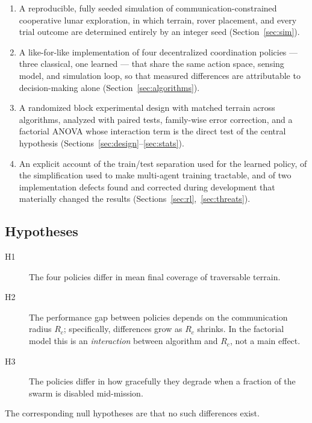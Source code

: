 \documentclass[11pt]{article}
\begin{document}
\begin{enumerate}
  \item A reproducible, fully seeded simulation of communication-constrained
        cooperative lunar exploration, in which terrain, rover placement, and
        every trial outcome are determined entirely by an integer seed
        (Section~\ref{sec:sim}).
  \item A like-for-like implementation of four decentralized coordination
        policies --- three classical, one learned --- that share the same action
        space, sensing model, and simulation loop, so that measured differences
        are attributable to decision-making alone (Section~\ref{sec:algorithms}).
  \item A randomized block experimental design with matched terrain across
        algorithms, analyzed with paired tests, family-wise error correction,
        and a factorial ANOVA whose interaction term is the direct test of the
        central hypothesis (Sections~\ref{sec:design}--\ref{sec:stats}).
  \item An explicit account of the train/test separation used for the learned
        policy, of the simplification used to make multi-agent training
        tractable, and of two implementation defects found and corrected during
        development that materially changed the results
        (Sections~\ref{sec:rl},~\ref{sec:threats}).
\end{enumerate}

\subsection{Hypotheses}

\begin{description}
  \item[H1] The four policies differ in mean final coverage of traversable
        terrain.
  \item[H2] The performance gap between policies depends on the communication
        radius $R_c$; specifically, differences grow as $R_c$ shrinks. In the
        factorial model this is an \emph{interaction} between algorithm and
        $R_c$, not a main effect.
  \item[H3] The policies differ in how gracefully they degrade when a fraction
        of the swarm is disabled mid-mission.
\end{description}

\noindent The corresponding null hypotheses are that no such differences exist.
\end{document}
